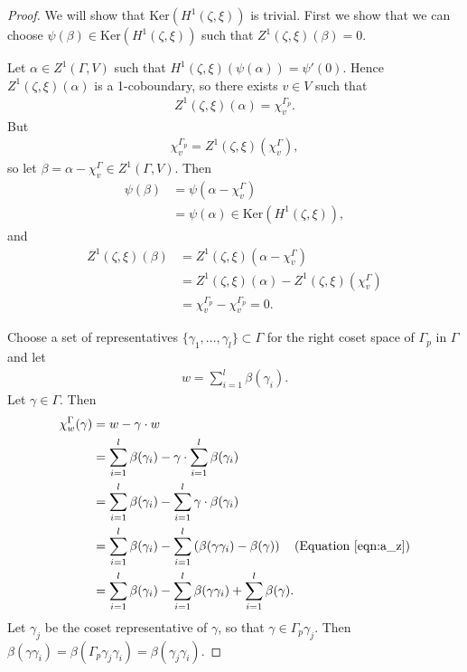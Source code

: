 \begin{proof}
	We will show that $\mathrm{Ker}\left(H^1(\zeta, \xi)\right)$ is trivial. First we show that we can choose $\psi(\beta) \in \mathrm{Ker}\left(H^1(\zeta, \xi)\right)$ such that $Z^1(\zeta, \xi)(\beta) = 0$.
	
	Let $\alpha \in Z^1(\Gamma, V)$ such that $H^1(\zeta, \xi)(\psi(\alpha)) = \psi'(0)$. Hence $Z^1(\zeta, \xi)(\alpha)$ is a 1-coboundary, so there exists $v \in V$ such that
\begin{align*}
	Z^1(\zeta, \xi)(\alpha) = \chi^{\Gamma_p}_v.
\end{align*}
But
\begin{align*}
	\chi^{\Gamma_p}_v = Z^1(\zeta, \xi)(\chi^\Gamma_v),
\end{align*}
so let $\beta = \alpha - \chi^\Gamma_v \in Z^1(\Gamma, V)$. Then
\begin{align*}
	\psi(\beta) &= \psi(\alpha - \chi^\Gamma_v) \\
		&= \psi(\alpha) \in \mathrm{Ker}\left(H^1(\zeta, \xi)\right),
	\end{align*}
	and
	\begin{align*}
		Z^1(\zeta, \xi)(\beta) &= Z^1(\zeta, \xi)(\alpha - \chi^\Gamma_v) \\
			&= Z^1(\zeta, \xi)(\alpha) - Z^1(\zeta, \xi)(\chi^\Gamma_v) \\
			&= \chi^{\Gamma_p}_v - \chi^{\Gamma_p}_v = 0.
		\end{align*}

		Choose a set of representatives $\{\gamma_1, \ldots, \gamma_l\} \subset \Gamma$ for the right coset space of $\Gamma_p$ in $\Gamma$ and let
\begin{align*}
	w = \sum_{i =1}^l \beta(\gamma_i).
\end{align*}
Let $\gamma \in \Gamma$. Then
\begin{align*}
	\chi_{w}^\Gamma(\gamma) &=  w - \gamma\cdot w \\
	&=  \sum_{i = 1}^l\beta(\gamma_i) - \gamma\cdot \sum_{i = 1}^l\beta(\gamma_i) \\
	&=  \sum_{i = 1}^l\beta(\gamma_i) - \sum_{i = 1}^l \gamma\cdot \beta(\gamma_i) \\
	&=  \sum_{i = 1}^l\beta(\gamma_i) - \sum_{i = 1}^l \left(\beta(\gamma\gamma_i) - \beta(\gamma) \right) \quad(\textrm{Equation }\ref{eqn:a_z})\\
	&=  \sum_{i = 1}^l\beta(\gamma_i) - \sum_{i = 1}^l \beta(\gamma\gamma_i) +\sum_{i = 1}^l \beta(\gamma).
\end{align*}
Let $\gamma_j$ be the coset representative of $\gamma$, so that $\gamma \in \Gamma_p\gamma_j$. Then $\beta(\gamma\gamma_i) = \beta(\Gamma_p\gamma_j\gamma_i) = \beta(\gamma_j\gamma_i)$.




\end{proof}
